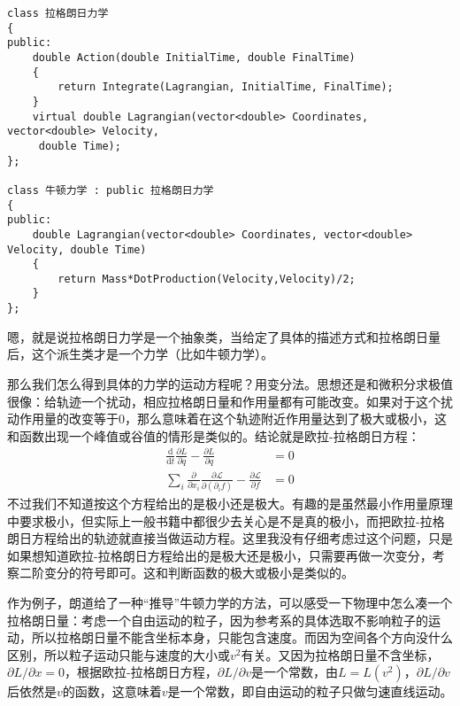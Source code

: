 \documentclass{ctexart}
\begin{document}
\begin{verbatim}
class 拉格朗日力学
{
public:
    double Action(double InitialTime, double FinalTime)
    {
        return Integrate(Lagrangian, InitialTime, FinalTime);
    }
    virtual double Lagrangian(vector<double> Coordinates, vector<double> Velocity,
     double Time);
};

class 牛顿力学 : public 拉格朗日力学
{
public:
    double Lagrangian(vector<double> Coordinates, vector<double> Velocity, double Time)
    {
        return Mass*DotProduction(Velocity,Velocity)/2;
    }
};
\end{verbatim}

嗯，就是说拉格朗日力学是一个抽象类，当给定了具体的描述方式和拉格朗日量后，这个派生类才是一个力学（比如牛顿力学）。

那么我们怎么得到具体的力学的运动方程呢？用变分法。思想还是和微积分求极值很像：给轨迹一个扰动，相应拉格朗日量和作用量都有可能改变。如果对于这个扰动作用量的改变等于0，那么意味着在这个轨迹附近作用量达到了极大或极小，这和函数出现一个峰值或谷值的情形是类似的。结论就是欧拉-拉格朗日方程：
\begin{align}
\frac{\mathrm{d}}{\mathrm{d}t}\frac{\partial L}{\partial\dot{q}}-\frac{\partial L}{\partial q}&=0 \\
\sum_i\frac{\partial}{\partial x_i}\frac{\partial\mathcal{L}}{\partial(\partial_if)}-\frac{\partial\mathcal{L}}{\partial f}&=0
\end{align}
不过我们不知道按这个方程给出的是极小还是极大。有趣的是虽然最小作用量原理中要求极小，但实际上一般书籍中都很少去关心是不是真的极小，而把欧拉-拉格朗日方程给出的轨迹就直接当做运动方程。这里我没有仔细考虑过这个问题，只是如果想知道欧拉-拉格朗日方程给出的是极大还是极小，只需要再做一次变分，考察二阶变分的符号即可。这和判断函数的极大或极小是类似的。

作为例子，朗道给了一种“推导”牛顿力学的方法，可以感受一下物理中怎么凑一个拉格朗日量：考虑一个自由运动的粒子，因为参考系的具体选取不影响粒子的运动，所以拉格朗日量不能含坐标本身，只能包含速度。而因为空间各个方向没什么区别，所以粒子运动只能与速度的大小或$v^2$有关。又因为拉格朗日量不含坐标，$\partial L/\partial x=0$，根据欧拉-拉格朗日方程，$\partial L/\partial v$是一个常数，由$L=L(v^2)$，$\partial L/\partial v$后依然是$v$的函数，这意味着$v$是一个常数，即自由运动的粒子只做匀速直线运动。

\vspace{2ex}
\end{document}

